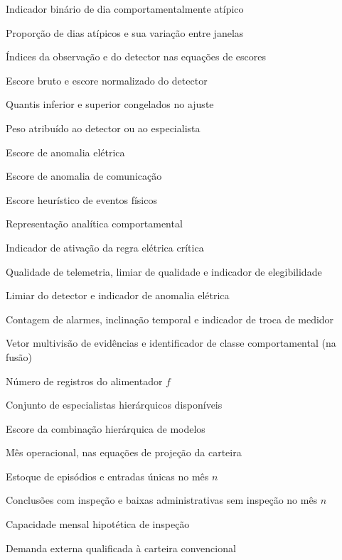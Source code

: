 \begin{description}[labelsep=4mm,labelwidth=42mm,leftmargin=46mm,align=left]
  \item[$A_{u,d}$] Indicador binário de dia comportamentalmente atípico
  \item[$R_A$, $\Delta R_A$] Proporção de dias atípicos e sua variação entre janelas
  \item[$i$, $m$] Índices da observação e do detector nas equações de escores
  \item[$s_{i,m}$, $z_{i,m}$] Escore bruto e escore normalizado do detector
  \item[$a_m$, $b_m$] Quantis inferior e superior congelados no ajuste
  \item[$w_m$] Peso atribuído ao detector ou ao especialista
  \item[$S_{elec}$] Escore de anomalia elétrica
  \item[$S_{comm}$] Escore de anomalia de comunicação
  \item[$S_{tamper}$] Escore heurístico de eventos físicos
  \item[$S_{behavior}$] Representação analítica comportamental
  \item[$R_i$] Indicador de ativação da regra elétrica crítica
  \item[$q_i$, $g$, $G_i$] Qualidade de telemetria, limiar de qualidade e indicador de elegibilidade
  \item[$\tau$, $D_i$] Limiar do detector e indicador de anomalia elétrica
  \item[$a_i$, $b_i$, $m_i$] Contagem de alarmes, inclinação temporal e indicador de troca de medidor
  \item[$\mathbf e_i$, $\kappa_i$] Vetor multivisão de evidências e identificador de classe comportamental (na fusão)
  \item[$n_f$] Número de registros do alimentador $f$
  \item[$\mathcal A_i$] Conjunto de especialistas hierárquicos disponíveis
  \item[$S_i^{MoE}$] Escore da combinação hierárquica de modelos
  \item[$n$] Mês operacional, nas equações de projeção da carteira
  \item[$B_n$, $A_n$] Estoque de episódios e entradas únicas no mês $n$
  \item[$R_n$, $X_n$] Conclusões com inspeção e baixas administrativas sem inspeção no mês $n$
  \item[$K_n$] Capacidade mensal hipotética de inspeção
  \item[$D_{\mathrm{novo},n}$] Demanda externa qualificada à carteira convencional

\end{description}
